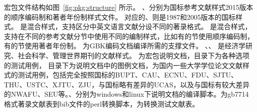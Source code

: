 \documentclass[11pt]{article} %
\begin{document}
宏包文件结构如图~\ref{fig:pkg:structure} 所示。
、分别为国标参考文献样式2015版本的顺序编码制和著者年份制样式文件。
对应的、则是1987和2005版本的国标样式。
是混合样式，支持区分中英文语言文献分设不同的著录格式。
是混合样式，支持在不同的参考文献分节中使用不同的编制样式，比如有的节使用顺序编码制，有的节使用著者年份制。
为GBK编码文档编译所需的支撑文件。
、、 是经济学研究、社会科学、管理世界期刊的文献样式。%
 为宏包说明文档，目录下为各种选项的测试用例，
目录下为说明文档中的图例文档，为国内一些大学学位论文文献样式的测试用例，包括完全按照国标的BUPT、CAU、ECNU、FDU、SJTU、THU、USTC、XJTU、ZJU，与国标略有差异的UCAS，以及与国标有较大差异的NWAFU、SEU等。、分别为windows和linux下说明文档的编译脚本。为gb7714格式著录文献表到bib文件的perl转换脚本，为转换测试文献表。
\end{document}
